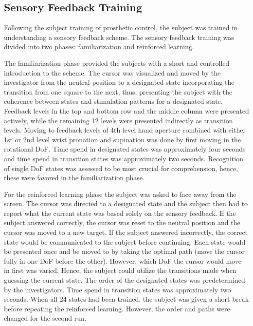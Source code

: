 
\subsection{Sensory Feedback Training}

Following the subject training of prosthetic control, the subject was trained in understanding a sensory feedback scheme. The sensory feedback training was divided into two phases: familiarization and reinforced learning. 

The familiarization phase provided the subjects with a short and controlled introduction to the scheme. The cursor was visualized and moved by the investigator from the neutral position to a designated state incorporating the transition from one square to the next, thus, presenting the subject with the coherence between states and stimulation patterns for a designated state. Feedback levels in the top and bottom row and the middle column were presented actively, while the remaining 12 levels were presented indirectly as transition levels. Moving to feedback levels of 4th level hand aperture combined with either 1st or 2nd level wrist pronation and supination was done by first moving in the rotational DoF. Time spend in designated states was approximately four seconds and time spend in transition states was approximately two seconds. Recognition of single DoF states was assessed to be most crucial for comprehension, hence, these were favored in the familiarization phase. 

For the reinforced learning phase the subject was asked to face away from the screen. The cursor was directed to a designated state and the subject then had to report what the current state was based solely on the sensory feedback. If the subject answered correctly, the cursor was reset to the neutral position and the cursor was moved to a new target. If the subject answered incorrectly, the correct state would be communicated to the subject before continuing. Each state would be presented once and be moved to by taking the optimal path (move the cursor fully in one DoF before the other). However, which DoF the cursor would move in first was varied. Hence, the subject could utilize the transitions made when guessing the current state. The order of the designated states was predetermined by the investigators. Time spend in transition states was approximately two seconds. When all 24 states had been trained, the subject was given a short break before repeating the reinforced learning. However, the order and paths were changed for the second run.